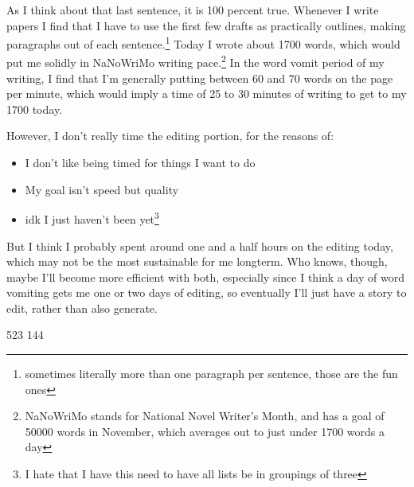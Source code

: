 \documentclass[12pt]{article}[titlepage]
\newcommand{\1}{\={a}}
\newcommand{\2}{\={e}}
\newcommand{\3}{\={\i}}
\newcommand{\4}{\=o}
\newcommand{\5}{\=u}
\newcommand{\6}{\={A}}
\renewcommand{\,}{\textsuperscript{,}}
\begin{document}
As I think about that last sentence, it is 100 percent true.
Whenever I write papers I find that I have to use the first few drafts as practically outlines, making paragraphs out of each sentence.\footnote{sometimes literally more than one paragraph per sentence, those are the fun ones}
Today I wrote about 1700 words, which would put me solidly in NaNoWriMo writing pace.\footnote{NaNoWriMo stands for National Novel Writer's Month, and has a goal of 50000 words in November, which averages out to just under 1700 words a day}
In the word vomit period of my writing, I find that I'm generally putting between 60 and 70 words on the page per minute, which would imply a time of 25 to 30 minutes of writing to get to my 1700 today.

However, I don't really time the editing portion, for the reasons of:
\begin{itemize}
\item I don't like being timed for things I want to do
\item My goal isn't speed but quality
\item idk I just haven't been yet\footnote{I hate that I have this need to have all lists be in groupings of three}
\end{itemize}
But I think I probably spent around one and a half hours on the editing today, which may not be the most sustainable for me longterm.
Who knows, though, maybe I'll become more efficient with both, especially since I think a day of word vomiting gets me one or two days of editing, so eventually I'll just have a story to edit, rather than also generate.

523
144
\end{document}
